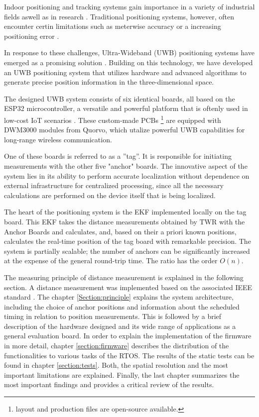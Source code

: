 \documentclass[conference, a4paper]{IEEEtran}
\begin{document}
Indoor positioning and tracking systems gain importance
in a variety of industrial fields aswell as in research \cite{LiFi_Positioning} \cite{Accelerometer_Positioning} \cite{UWB_Positioning} \cite{UWB_Positioning2}.
Traditional positioning systems, however, often encounter certin limitations such as
meterwise accuracy \cite{LiFi_Positioning} or a increasing positioning error \cite{Accelerometer_Positioning}. 

In response to these challenges, Ultra-Wideband (UWB) positioning systems have emerged
as a promising solution \cite{UWB_Positioning} \cite{UWB_Positioning2}.
Building on this technology, we have developed an \ac{UWB} positioning system
that utilizes hardware and advanced algorithms to generate precise position information in the
three-dimensional space.

The designed \ac{UWB} system consists of six identical boards,
all based on the ESP32 microcontroller, a versatile and powerful platform that is 
oftenly used in low-cost \ac{IoT} scenarios \cite{ESP32}.
These custom-made \acp{PCB}
\footnote{layout and production files are open-source available.\cite{uwb-tracking}}
are equipped with DWM3000 modules from Quorvo,
which utalize powerful UWB capabilities for long-range wireless communication.

One of these boards is referred to as a ''tag''.
It is responsible for initiating measurements with the other five "anchor" boards.
The innovative aspect of the system lies in its ability to perform accurate localization
without dependence on external infrastructure for centralized processing,
since all the necessary calculations are performed on the device itself that is being localized.

The heart of the positioning system is the \acf{EKF} implemented locally on the tag board.
This \ac{EKF} takes the distance measurements obtained by \acf{TWR} with the Anchor Boards and calculates,
and, based on their a priori known positions, calculates the real-time position of the tag board
with \color{red}remarkable \color{black}precision.
The system is partially scalable; the number of anchors can be significantly increased at
the expense of the general round-trip time. The ratio has the order $O(n)$.

The measuring principle of distance measurement is explained in the following section.
A distance measurement was implemented based on the associated IEEE standard  \cite{IEEE802154a} \cite{IEEE802154z}.
The chapter \ref{Section:principle} explains the system architecture,
including the choice of anchor positions and 
information about the scheduled timing in relation to position measurements.
This is followed by a brief description of the hardware designed and
its wide range of applications as a general evaluation board.
In order to explain the implementation of the firmware in more detail,
chapter \ref{section:firmware} describes the distribution of the functionalities to various tasks of the \ac{RTOS}.
The results of the static tests can be found in chapter \ref{section:tests}.
Both, the spatial resolution and the most important limitations are explained.
Finally, the last chapter summarizes the most important findings and provides a critical review of the results.
\end{document}
